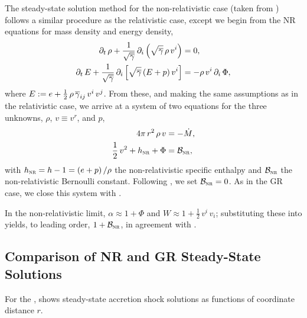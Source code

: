 The steady-state solution method for the non-relativistic case
(taken from \citet{bmd2003}) follows a similar procedure
as the relativistic case,
except we begin from the NR equations for mass density and energy density,
\begin{align}
  \partial_{t}\,\rho+\frac{1}{\sqrt{\overline{\gamma}}}\,
  \partial_{i}\left(\sqrt{\overline{\gamma}}\,\rho\,v^{i}\right)
  &=0,\\
  \partial_{t}\,E+\frac{1}{\sqrt{\overline{\gamma}}}\,
  \partial_{i}\left[\sqrt{\overline{\gamma}}\left(E+p\right)v^{i}\right]
  &=-\rho\,v^{i}\,\partial_{i}\,\Phi,
\end{align}
where $E:=e+\frac{1}{2}\,\rho\,\overline{\gamma}_{ij}\,v^{i}\,v^{j}$.
From these, and making the same assumptions as in the relativistic case,
we arrive at a system of two equations for the three unknowns,
$\rho$, $v\equiv v^{r}$, and $p$,
\begin{align}
  4\pi\,r^{2}\,\rho\,v&=-\dot{M},\label{eq.MassConservationNR}\\
  \frac{1}{2}\,v^{2}+h_{\textsc{nr}}+\Phi&=\mathcal{B}_{\textsc{nr}},
  \label{eq.BernoulliNR}
\end{align}
with $h_{\textsc{nr}}=h-1=\left(e+p\right)/\rho$
the non-relativistic specific enthalpy and $\mathcal{B}_{\textsc{nr}}$
the non-relativistic Bernoulli constant.
Following \citet{bmd2003}, we set $\mathcal{B}_{\textsc{nr}}=0$.
As in the GR case, we close this system with .

In the non-relativistic limit,
$\alpha\approx1+\Phi$ and $W\approx1+\frac{1}{2}\,v^{i}\,v_{i}$;
substituting these into  yields, to leading order,
$1+\mathcal{B}_{\textsc{nr}}$,
in agreement with .

\subsection{Comparison of NR and GR Steady-State Solutions}

For the 
\citep[e.g., see][]{bmh2013,mjm2015,brv2020},
 shows steady-state accretion shock solutions
as functions of coordinate distance $r$.

